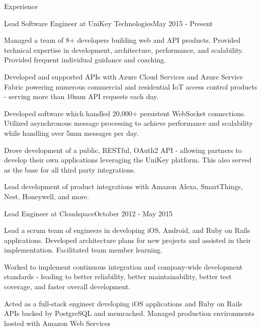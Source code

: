 \documentclass{resume} %
\begin{document}
\begin{rSection}{Experience}


\begin{rSubsection}{Lead Software Engineer at UniKey Technologies}{May 2015 - Present}{}{}

\item Managed a team of 8+ developers building web and API products.  Provided technical expertise in development, architecture,  performance, and scalability.  Provided frequent individual guidance and coaching.
\item Developed and supported APIs with Azure Cloud Services and Azure Service Fabric powering numerous commercial and residential IoT access control products - serving more than 10mm API requests each day.
\item Developed software which handled 20,000+ persistent WebSocket connections. Utilized asynchronous message processing to achieve performance and scalability while handling over 5mm messages per day.
\item Drove development of a public, RESTful, OAuth2 API - allowing partners to develop their own applications leveraging the UniKey platform.  This also served as the base for all third party integrations.
\item Lead development of product integrations with Amazon Alexa, SmartThings, Nest, Honeywell, and more.

\end{rSubsection}


\begin{rSubsection}{Lead Engineer at Cloudspace}{October 2012 - May 2015}{}{}

\item Lead a scrum team of engineers in developing iOS, Android, and Ruby on Rails applications.  Developed architecture plans for new projects and assisted in their implementation. Facilitated team member learning.
\item Worked to implement continuous integration and company-wide development standards - leading to better reliability, better maintainability, better test coverage, and faster overall development.
\item Acted as a full-stack engineer developing iOS applications and Ruby on Rails APIs backed by PostgreSQL and memcached. Managed production environments hosted with Amazon Web Services


\end{rSubsection}
\end{rSection}
\end{document}
